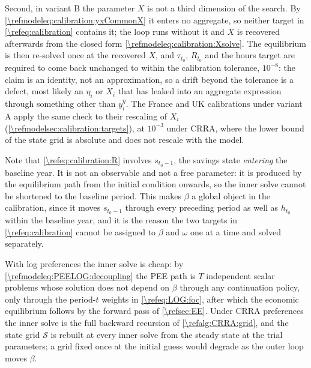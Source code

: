 Second, in variant B the parameter $X$ is not a third dimension of the search. By \eqref{\refmodeleq:calibration:yxCommonX} it enters no aggregate, so neither target in \eqref{\refeq:calibration} contains it; the loop runs without it and $X$ is recovered afterwards from the closed form \eqref{\refmodeleq:calibration:Xsolve}. The equilibrium is then re-solved once at the recovered $X$, and $\tau_{t_0}$, $R_{t_0}$ and the hours target are required to come back unchanged to within the calibration tolerance, $10^{-8}$: the claim is an identity, not an approximation, so a drift beyond the tolerance is a defect, most likely an $\eta_i$ or $X_i$ that has leaked into an aggregate expression through something other than $y_i^{\eta}$. The France and UK calibrations under variant A apply the same check to their rescaling of $X_i$ (\cref{\refmodelsec:calibration:targets}), at $10^{-3}$ under CRRA, where the lower bound of the state grid is absolute and does not rescale with the model.

Note that \eqref{\refeq:calibration:R} involves $s_{t_0-1}$, the savings state \emph{entering} the baseline year. It is not an observable and not a free parameter: it is produced by the equilibrium path from the initial condition onwards, so the inner solve cannot be shortened to the baseline period. This makes $\beta$ a global object in the calibration, since it moves $s_{t_0-1}$ through every preceding period as well as $h_{t_0}$ within the baseline year, and it is the reason the two targets in \eqref{\refeq:calibration} cannot be assigned to $\beta$ and $\omega$ one at a time and solved separately.

With log preferences the inner solve is cheap: by \eqref{\refmodeleq:PEELOG:decoupling} the PEE path is $T$ independent scalar problems whose solution does not depend on $\beta$ through any continuation policy, only through the period-$t$ weights in \eqref{\refeq:LOG:foc}, after which the economic equilibrium follows by the forward pass of \cref{\refsec:EE}. Under CRRA preferences the inner solve is the full backward recursion of \cref{\refalg:CRRA:grid}, and the state grid $\mathcal{S}$ is rebuilt at every inner solve from the steady state at the trial parameters; a grid fixed once at the initial guess would degrade as the outer loop moves $\beta$.
